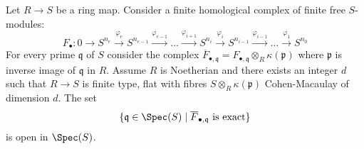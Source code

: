 \begin{lemma}
\label{lemma-exact-on-fibres-open}
Let $R \to S$ be a ring map. Consider a finite homological complex of
finite free $S$-modules:
$$
F_{\bullet} :
0
\to
S^{n_e}
\xrightarrow{\varphi_e}
S^{n_{e-1}}
\xrightarrow{\varphi_{e-1}}
\ldots
\xrightarrow{\varphi_{i + 1}}
S^{n_i}
\xrightarrow{\varphi_i}
S^{n_{i-1}}
\xrightarrow{\varphi_{i-1}}
\ldots
\xrightarrow{\varphi_1}
S^{n_0}
$$
For every prime $\mathfrak q$ of $S$ consider the
complex $\overline{F}_{\bullet, \mathfrak q} =
F_{\bullet, \mathfrak q} \otimes_R \kappa(\mathfrak p)$
where $\mathfrak p$ is inverse image of $\mathfrak q$ in $R$.
Assume $R$ is Noetherian and there exists an integer $d$ such
that $R \to S$ is finite type, flat
with fibres $S \otimes_R \kappa(\mathfrak p)$
Cohen-Macaulay of dimension $d$.
The set
$$
\{\mathfrak q \in \Spec(S) \mid
\overline{F}_{\bullet, \mathfrak q}\text{ is exact}\}
$$
is open in $\Spec(S)$.
\end{lemma}

